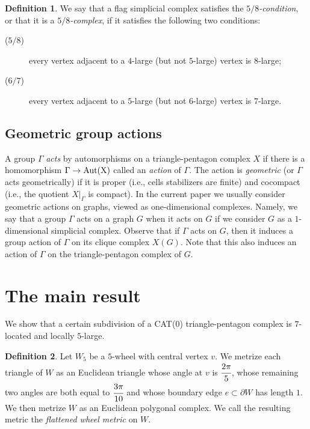 \documentclass{amsart}
\theoremstyle{definition}
\newtheorem{definition}{Definition}[section]
\theoremstyle{remark}
\numberwithin{equation}{section}
\begin{document}
\begin{definition}\label{2.2}
We say that a flag simplicial complex satisfies the \emph{$5/8$-condition}, or that it is a \emph{$5/8$-complex}, if it satisfies the following two conditions:
\begin{description}
\item[($5/8$)]
every vertex adjacent to a $4$-large (but not $5$-large) vertex is $8$-large;
\item[($6/7$)]
every vertex adjacent to a $5$-large (but not $6$-large) vertex is $7$-large.
\end{description}
\end{definition}

\subsection{Geometric group actions}

A group $\Gamma$ \textit{acts} by automorphisms on a triangle-pentagon complex $X$ if there is a homomorphism $\Gamma \rightarrow \rm{Aut}(X)$ called
an \textit{action} of $\Gamma$. The action is \emph{geometric} (or $\Gamma$ acts geometrically) if it is proper (i.e., cells stabilizers are
finite) and cocompact (i.e., the quotient $X|_{\Gamma}$ is compact). In the current paper we usually consider
geometric actions on graphs, viewed as one-dimensional complexes. Namely, we say that a group $\Gamma$ acts
on a graph $G$ when it acts on $G$ if we consider $G$ as a $1$-dimensional simplicial complex. Observe that if $\Gamma$ acts on $G$, then it induces a group action of $\Gamma$ on its clique complex $X(G)$. Note that this also induces an action of $\Gamma$ on the triangle-pentagon complex of $G$.


\section{The main result}

We show that a certain subdivision of a CAT(0)  triangle-pentagon complex is $7$-located and locally $5$-large.

\begin{definition}
Let $W_{5}$ be a $5$-wheel with central vertex $v$. We metrize each triangle of $W$ as an Euclidean triangle whose angle at $v$ is $\cfrac{2 \pi}{5}$, whose remaining two angles are both equal to $\cfrac{3 \pi}{10}$ and whose boundary edge $e \subset \partial W$ has length $1$. We then metrize $W$ as an Euclidean polygonal complex. We call the resulting metric the \emph{flattened wheel metric} on $W$.
\end{definition}
\end{document}
